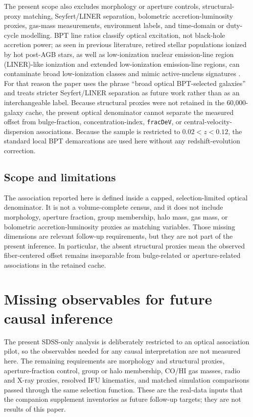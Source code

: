\documentclass[twocolumn]{aastex631}
\begin{document}
The present scope also excludes morphology or aperture controls, structural-proxy matching, Seyfert/LINER separation, bolometric accretion-luminosity proxies, gas-mass measurements, environment labels, and time-domain or duty-cycle modelling. BPT line ratios classify optical excitation, not black-hole accretion power; as seen in previous literature, retired stellar populations ionized by hot post-AGB stars, as well as low-ionization nuclear emission-line region (LINER)-like ionization and extended low-ionization emission-line regions, can contaminate broad low-ionization classes and mimic active-nucleus signatures \citep{cidfernandes2011,stasinska2008,stasinska2015,belfiore2016}. For that reason the paper uses the phrase ``broad optical BPT-selected galaxies'' and treats stricter Seyfert/LINER separation as future work rather than as an interchangeable label. Because structural proxies were not retained in the 60,000-galaxy cache, the present optical denominator cannot separate the measured offset from bulge-fraction, concentration-index, \texttt{fracDeV}, or central-velocity-dispersion associations. Because the sample is restricted to $0.02<z<0.12$, the standard local BPT demarcations are used here without any redshift-evolution correction.

\subsection{Scope and limitations}
The association reported here is defined inside a capped, selection-limited optical denominator. It is not a volume-complete census, and it does not include morphology, aperture fraction, group membership, halo mass, gas mass, or bolometric accretion-luminosity proxies as matching variables. Those missing dimensions are relevant follow-up requirements, but they are not part of the present inference. In particular, the absent structural proxies mean the observed fiber-centered offset remains inseparable from bulge-related or aperture-related associations in the retained cache.

\section{Missing observables for future causal inference}
The present SDSS-only analysis is deliberately restricted to an optical association pilot, so the observables needed for any causal interpretation are not measured here. The remaining requirements are morphology and structural proxies, aperture-fraction control, group or halo membership, CO/HI gas masses, radio and X-ray proxies, resolved IFU kinematics, and matched simulation comparisons passed through the same selection function. These are the real-data inputs that the companion supplement inventories as future follow-up targets; they are not results of this paper.
\end{document}
